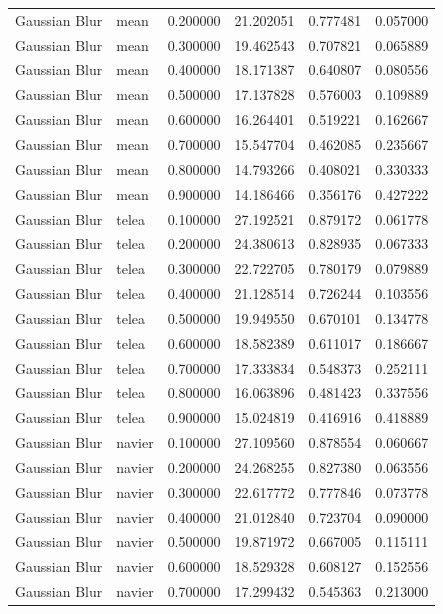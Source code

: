 \begin{table}[h]
\begin{tabular}{llrrrr}
Gaussian Blur & mean & 0.200000 & 21.202051 & 0.777481 & 0.057000 \\
Gaussian Blur & mean & 0.300000 & 19.462543 & 0.707821 & 0.065889 \\
Gaussian Blur & mean & 0.400000 & 18.171387 & 0.640807 & 0.080556 \\
Gaussian Blur & mean & 0.500000 & 17.137828 & 0.576003 & 0.109889 \\
Gaussian Blur & mean & 0.600000 & 16.264401 & 0.519221 & 0.162667 \\
Gaussian Blur & mean & 0.700000 & 15.547704 & 0.462085 & 0.235667 \\
Gaussian Blur & mean & 0.800000 & 14.793266 & 0.408021 & 0.330333 \\
Gaussian Blur & mean & 0.900000 & 14.186466 & 0.356176 & 0.427222 \\
Gaussian Blur & telea & 0.100000 & 27.192521 & 0.879172 & 0.061778 \\
Gaussian Blur & telea & 0.200000 & 24.380613 & 0.828935 & 0.067333 \\
Gaussian Blur & telea & 0.300000 & 22.722705 & 0.780179 & 0.079889 \\
Gaussian Blur & telea & 0.400000 & 21.128514 & 0.726244 & 0.103556 \\
Gaussian Blur & telea & 0.500000 & 19.949550 & 0.670101 & 0.134778 \\
Gaussian Blur & telea & 0.600000 & 18.582389 & 0.611017 & 0.186667 \\
Gaussian Blur & telea & 0.700000 & 17.333834 & 0.548373 & 0.252111 \\
Gaussian Blur & telea & 0.800000 & 16.063896 & 0.481423 & 0.337556 \\
Gaussian Blur & telea & 0.900000 & 15.024819 & 0.416916 & 0.418889 \\
Gaussian Blur & navier & 0.100000 & 27.109560 & 0.878554 & 0.060667 \\
Gaussian Blur & navier & 0.200000 & 24.268255 & 0.827380 & 0.063556 \\
Gaussian Blur & navier & 0.300000 & 22.617772 & 0.777846 & 0.073778 \\
Gaussian Blur & navier & 0.400000 & 21.012840 & 0.723704 & 0.090000 \\
Gaussian Blur & navier & 0.500000 & 19.871972 & 0.667005 & 0.115111 \\
Gaussian Blur & navier & 0.600000 & 18.529328 & 0.608127 & 0.152556 \\
Gaussian Blur & navier & 0.700000 & 17.299432 & 0.545363 & 0.213000 \\

\end{tabular}
\end{table}
